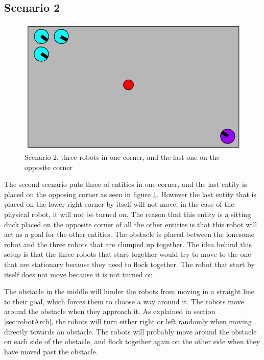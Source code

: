 \subsection{Scenario 2}
\begin{figure}[H]
\begin{center}
\includegraphics[width=0.8\linewidth]{figs/scenario1}
\end{center}
\caption[scenario 2]{Scenario 2, three robots in one corner, and the last one on the opposite corner}
\label{fig:scenario2}
\end{figure}

The second scenario puts three of entities in one corner, and the last entity is placed on the opposing corner as seen in figure \ref{fig:scenario2}. However the last entity that is placed on the lower right corner by itself will not move, in the case of the physical robot, it will not be turned on. The reason that this entity is a sitting duck placed on the opposite corner of all the other entities is that this robot will act as a goal for the other entities. The obstacle is placed between the lonesome robot and the three robots that are clumped up together. The idea behind this setup is that the three robots that start together would try to move to the one that are stationary because they need to flock together. The robot that start by itself does not move because it is not turned on.

The obstacle in the middle will hinder the robots from moving in a straight line to their goal, which forces them to choose a way around it. The robots move around the obstacle when they approach it. As explained in section \ref{sec:robotArch}, the robots will turn either right or left randomly when moving directly towards an obstacle. The robots will probably move around the obstacle on each side of the obstacle, and flock together again on the other side when they have moved past the obstacle.


